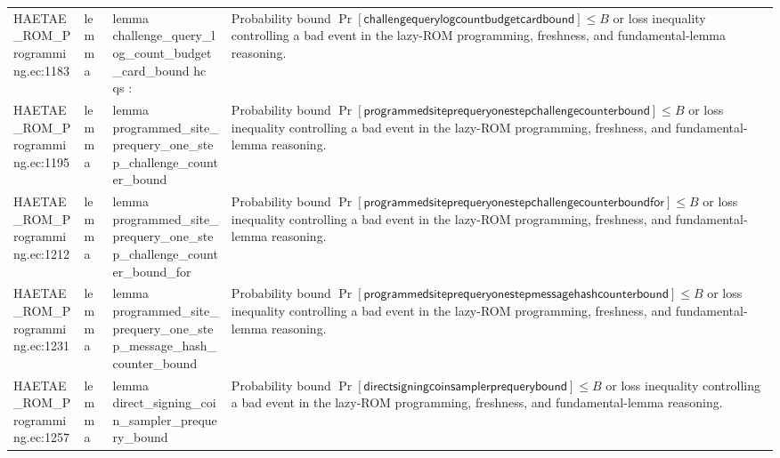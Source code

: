 \documentclass[10pt]{article}
\begin{document}
\begin{longtable}{L{0.11\textwidth}L{0.055\textwidth}L{0.385\textwidth}L{0.41\textwidth}}
HAETAE\_\allowbreak{}ROM\_\allowbreak{}Programming.\allowbreak{}ec:\allowbreak{}1183 & lemma & {\ttfamily\scriptsize lemma challenge\_\allowbreak{}query\_\allowbreak{}log\_\allowbreak{}count\_\allowbreak{}budget\_\allowbreak{}card\_\allowbreak{}bound hc qs :} & Probability bound $\Pr[\mathsf{challengequerylogcountbudgetcardbound}]\le B$ or loss inequality controlling a bad event in the lazy-ROM programming, freshness, and fundamental-lemma reasoning. \\
HAETAE\_\allowbreak{}ROM\_\allowbreak{}Programming.\allowbreak{}ec:\allowbreak{}1195 & lemma & {\ttfamily\scriptsize lemma programmed\_\allowbreak{}site\_\allowbreak{}prequery\_\allowbreak{}one\_\allowbreak{}step\_\allowbreak{}challenge\_\allowbreak{}counter\_\allowbreak{}bound} & Probability bound $\Pr[\mathsf{programmedsiteprequeryonestepchallengecounterbound}]\le B$ or loss inequality controlling a bad event in the lazy-ROM programming, freshness, and fundamental-lemma reasoning. \\
HAETAE\_\allowbreak{}ROM\_\allowbreak{}Programming.\allowbreak{}ec:\allowbreak{}1212 & lemma & {\ttfamily\scriptsize lemma programmed\_\allowbreak{}site\_\allowbreak{}prequery\_\allowbreak{}one\_\allowbreak{}step\_\allowbreak{}challenge\_\allowbreak{}counter\_\allowbreak{}bound\_\allowbreak{}for} & Probability bound $\Pr[\mathsf{programmedsiteprequeryonestepchallengecounterboundfor}]\le B$ or loss inequality controlling a bad event in the lazy-ROM programming, freshness, and fundamental-lemma reasoning. \\
HAETAE\_\allowbreak{}ROM\_\allowbreak{}Programming.\allowbreak{}ec:\allowbreak{}1231 & lemma & {\ttfamily\scriptsize lemma programmed\_\allowbreak{}site\_\allowbreak{}prequery\_\allowbreak{}one\_\allowbreak{}step\_\allowbreak{}message\_\allowbreak{}hash\_\allowbreak{}counter\_\allowbreak{}bound} & Probability bound $\Pr[\mathsf{programmedsiteprequeryonestepmessagehashcounterbound}]\le B$ or loss inequality controlling a bad event in the lazy-ROM programming, freshness, and fundamental-lemma reasoning. \\
HAETAE\_\allowbreak{}ROM\_\allowbreak{}Programming.\allowbreak{}ec:\allowbreak{}1257 & lemma & {\ttfamily\scriptsize lemma direct\_\allowbreak{}signing\_\allowbreak{}coin\_\allowbreak{}sampler\_\allowbreak{}prequery\_\allowbreak{}bound} & Probability bound $\Pr[\mathsf{directsigningcoinsamplerprequerybound}]\le B$ or loss inequality controlling a bad event in the lazy-ROM programming, freshness, and fundamental-lemma reasoning. \\

\end{longtable}
\end{document}
